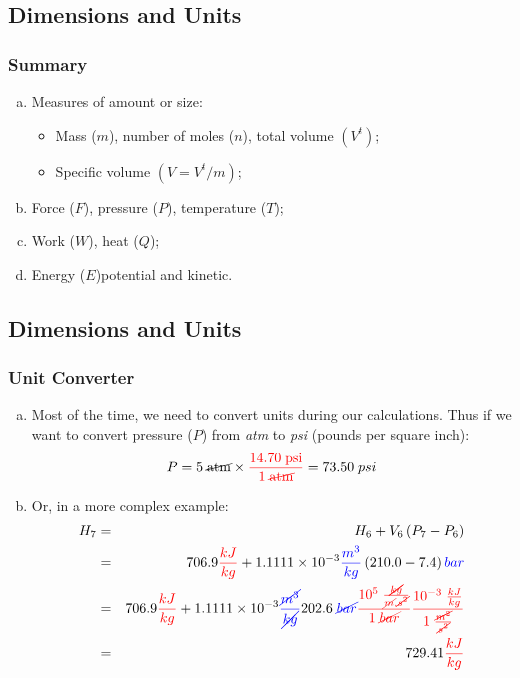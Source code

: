 \documentclass[10pt,compress]{beamer}
\begin{document}
\subsection{Dimensions and Units}
\begin{frame}
 \frametitle{Summary}
  \begin{enumerate}[(a)]
   \item <1-> Measures of amount or size:
     \begin{itemize}
       \item<1-> Mass ($m$), number of moles ($n$), total volume $\left(V^{t}\right)$;
       \item<1-> Specific volume $\left(V=V^{t}/m\right)$;
     \end{itemize}
   \item<1-> Force ($F$), pressure ($P$), temperature ($T$);
   \item<1-> Work ($W$), heat ($Q$);
   \item<1-> Energy ($E$)potential and kinetic.
  \end{enumerate} 
\end{frame}

\subsection{Dimensions and Units}
\begin{frame}
 \frametitle{Unit Converter}
  \begin{enumerate}[(a)]
   \item<1-> Most of the time, we need to convert units during our calculations. Thus if we want to convert pressure ($P$) from {\it atm} to {\it psi} (pounds per square inch):
      \begin{displaymath}
        P = 5\;\cancel{\text{atm}} \times \textcolor{red}{\displaystyle\frac{14.70\;\text{psi}}{1\;\cancel{\text{atm}}}} = 73.50\;psi
      \end{displaymath}
   \item<2-> Or, in a more complex example:
      \begin{eqnarray}
        H_{7} &=& H_{6} + V_{6}\left(P_{7}-P_{6}\right) \nonumber \\
              &=& 706.9\textcolor{red}{\frac{kJ}{kg}} + 1.1111\times 10^{-3}\textcolor{blue}{\frac{m^{3}}{kg}}\left(210.0-7.4\right)\textcolor{blue}{bar} \nonumber \\
              &=& 706.9\textcolor{red}{\frac{kJ}{kg}} + 1.1111\times 10^{-3}\textcolor{blue}{\frac{\cancel{m^{3}}}{\cancel{kg}}} 202.6\;\textcolor{blue}{\cancel{bar}} \textcolor{red}{\frac{10^{5}\;\frac{\cancel{kg}}{\cancel{m}.\cancel{s^{2}}}}{1\; \cancel{bar}}} \textcolor{red}{\frac{10^{-3}\; \frac{kJ}{kg}}{1\;\frac{\cancel{m^{2}}}{\cancel{s^{2}}}}} \nonumber \\
              &=& 729.41\textcolor{red}{\frac{kJ}{kg}} \nonumber 
      \end{eqnarray} 
  \end{enumerate}
\end{frame}
\end{document}

